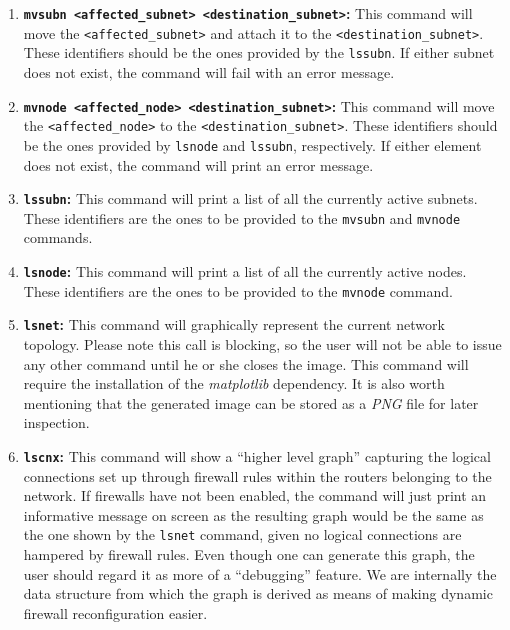                 \begin{enumerate}
                    \item \textbf{\texttt{mvsubn <affected\_subnet> <destination\_subnet>}:} This command will move the \texttt{<affected\_subnet>} and attach it to the \texttt{\allowbreak<destination\_subnet>}. These identifiers should be the ones provided by the \texttt{lssubn}. If either subnet does not exist, the command will fail with an error message.
                    \item \textbf{\texttt{mvnode <affected\_node> <destination\_subnet>}:} This command will move the \texttt{<affected\_node>} to the \texttt{<destination\_subnet>}. These identifiers should be the ones provided by \texttt{lsnode} and \texttt{lssubn}, respectively. If either element does not exist, the command will print an error message.
                    \item \textbf{\texttt{lssubn}:} This command will print a list of all the currently active subnets. These identifiers are the ones to be provided to the \texttt{mvsubn} and \texttt{mvnode} commands.
                    \item \textbf{\texttt{lsnode}:} This command will print a list of all the currently active nodes. These identifiers are the ones to be provided to the \texttt{mvnode} command.
                    \item \textbf{\texttt{lsnet}:} This command will graphically represent the current network topology. Please note this call is blocking, so the user will not be able to issue any other command until he or she closes the image. This command will require the installation of the \textit{matplotlib} dependency. It is also worth mentioning that the generated image can be stored as a \textit{PNG} file for later inspection.
                    \item \textbf{\texttt{lscnx}:} This command will show a ``higher level graph'' capturing the logical connections set up through firewall rules within the routers belonging to the network. If firewalls have not been enabled, the command will just print an informative message on screen as the resulting graph would be the same as the one shown by the \texttt{lsnet} command, given no logical connections are hampered by firewall rules. Even though one can generate this graph, the user should regard it as more of a ``debugging'' feature. We are internally the data structure from which the graph is derived as means of making dynamic firewall reconfiguration easier.

\end{enumerate}
